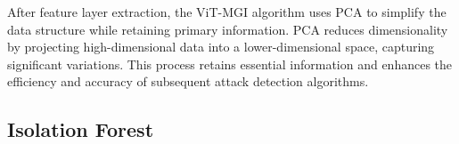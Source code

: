 \documentclass[conference]{IEEEtran}
\begin{document}

After feature layer extraction, the ViT-MGI algorithm uses PCA to simplify the data structure while retaining primary information. PCA reduces dimensionality by projecting high-dimensional data into a lower-dimensional space, capturing significant variations. This process retains essential information and enhances the efficiency and accuracy of subsequent attack detection algorithms.

\subsection{Isolation Forest}
\label{sec:method_forest}







\end{document}

